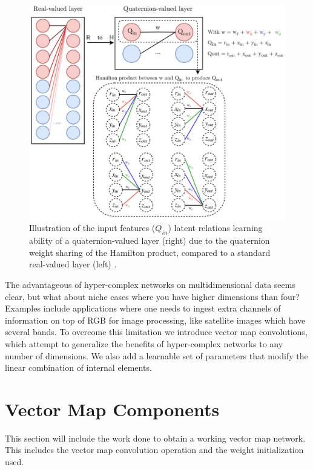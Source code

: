 \documentclass[14pt,a4paper]{article}
\begin{document}
\begin{figure}
	\centering
		\includegraphics[width=1.0\columnwidth]{figures/real-to-quaternion.jpg}
		\caption{Illustration of the input features ($Q_{in}$) latent relations learning ability of a quaternion-valued layer (right) due to the quaternion weight sharing of the Hamilton product, compared to a standard real-valued layer (left) \cite{parcollet2018quaternion-A}.}
	\label{f:hamilton}
\end{figure}

The advantageous of hyper-complex networks on multidimensional data seems clear, but what about niche cases where you have higher dimensions than four?
Examples include applications where one needs to ingest extra channels of information on top of RGB for image processing, like satellite images which have several bands.
To overcome this limitation we introduce vector map convolutions, which attempt to generalize the benefits of hyper-complex networks to any number of dimensions.
We also add a learnable set of parameters that modify the linear combination of internal elements.


\section{Vector Map Components}
This section will include the work done to obtain a working vector map network.
This includes the vector map convolution operation and the weight initialization used.
\end{document}
